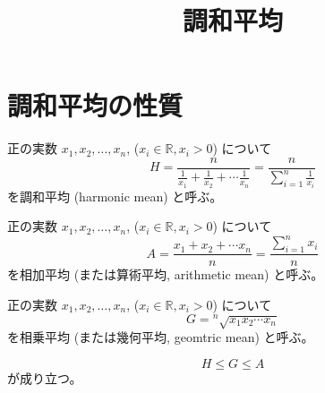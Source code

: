 \documentclass[12pt]{jsarticle}
\title{調和平均}
\begin{document}
\maketitle

\section{調和平均の性質}

\begin{definition}[調和平均]
正の実数 $x_1, x_2, \ldots, x_n$,
($x_i \in \mathbb{R}, x_i > 0$) について
\begin{equation}
H = \frac{n}{\frac{1}{x_1} + \frac{1}{x_2} + \cdots \frac{1}{x_n}}
= \frac{n}{\sum_{i=1}^{n} \frac{1}{x_i}}
\end{equation}
を調和平均 (harmonic mean) と呼ぶ。
\end{definition}

\begin{definition}[相加平均]
正の実数 $x_1, x_2, \ldots, x_n$,
($x_i \in \mathbb{R}, x_i > 0$) について
\begin{equation}
A = \frac{x_1 + x_2 + \cdots x_n}{n}
= \frac{\sum_{i=1}^{n} x_i}{n}
\end{equation}
を相加平均 (または算術平均, arithmetic mean) と呼ぶ。
\end{definition}

\begin{definition}[相乗平均]
正の実数 $x_1, x_2, \ldots, x_n$,
($x_i \in \mathbb{R}, x_i > 0$) について
\begin{equation}
G = {}^{n} \sqrt{x_1 x_2 \cdots x_n}
\end{equation}
を相乗平均 (または幾何平均, geomtric mean) と呼ぶ。
\end{definition}

\begin{theorem}[平均の不等式]
\begin{equation}
H \le G \le A
\end{equation}
が成り立つ。
\end{theorem}
\end{document}
